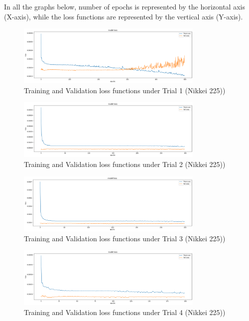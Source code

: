 \documentclass[a4paper,11pt,oneside]{book}
\begin{document}
\begin{appendix}
	
In all the graphs below, number of epochs is represented by the
horizontal axis (X-axis), while the loss functions are represented by the vertical axis
(Y-axis).

\begin{figure}[!h]
	\centering
	\includegraphics[width=0.8\textwidth]{figures/Nik1}
	\caption{Training and Validation loss functions under Trial 1 (Nikkei 225))}
	\label{Nik1}
\end{figure}

\begin{figure}[!h]
	\centering
	\includegraphics[width=0.8\textwidth]{figures/Nik2}
	\caption{Training and Validation loss functions under Trial 2 (Nikkei 225))}
	\label{Nik2}
\end{figure}


\begin{figure}[!h]
	\centering
	\includegraphics[width=0.8\textwidth]{figures/Nik3}
	\caption{Training and Validation loss functions under Trial 3 (Nikkei 225))}
	\label{Nik3}
\end{figure}

\begin{figure}[!h]
	\centering
	\includegraphics[width=0.8\textwidth]{figures/Nik4}
	\caption{Training and Validation loss functions under Trial 4 (Nikkei 225))}
	\label{Nik4}
\end{figure}



\end{appendix}
\end{document}
